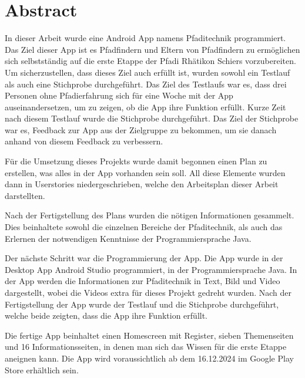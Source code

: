 \chapter*{Abstract}

In dieser Arbeit wurde eine Android App namens Pfaditechnik programmiert. Das Ziel dieser App ist es Pfadfindern und Eltern von Pfadfindern zu ermöglichen sich selbstständig auf die erste Etappe der Pfadi Rhätikon Schiers vorzubereiten. Um sicherzustellen, dass dieses Ziel auch erfüllt ist, wurden sowohl ein Testlauf als auch eine Stichprobe durchgeführt. Das Ziel des Testlaufs war es, dass drei Personen ohne Pfadierfahrung sich für eine Woche mit der App auseinandersetzen, um zu zeigen, ob die App ihre Funktion erfüllt. Kurze Zeit nach diesem Testlauf wurde die Stichprobe durchgeführt. Das Ziel der Stichprobe war es, Feedback zur App aus der Zielgruppe zu bekommen, um sie danach anhand von diesem Feedback zu verbessern. \par
Für die Umsetzung dieses Projekts wurde damit begonnen einen Plan zu erstellen, was alles in der App vorhanden sein soll. All diese Elemente wurden dann in Userstories niedergeschrieben, welche den Arbeitsplan dieser Arbeit darstellten.\par
Nach der Fertigstellung des Plans wurden die nötigen Informationen gesammelt. Dies beinhaltete sowohl die einzelnen Bereiche der Pfaditechnik, als auch das Erlernen der notwendigen Kenntnisse der Programmiersprache Java.\par
Der nächste Schritt war die Programmierung der App. Die App wurde in der Desktop App Android Studio programmiert, in der Programmiersprache Java. In der App werden die Informationen zur Pfaditechnik in Text, Bild und Video dargestellt, wobei die Videos extra für dieses Projekt gedreht wurden. Nach der Fertigstellung der App wurde der Testlauf und die Stichprobe durchgeführt, welche beide zeigten, dass die App ihre Funktion erfüllt.\par
Die fertige App beinhaltet einen Homescreen mit Register, sieben Themenseiten und 16 Informationsseiten, in denen man sich das Wissen für die erste Etappe aneignen kann. Die App wird voraussichtlich ab dem 16.12.2024 im Google Play Store erhältlich sein.